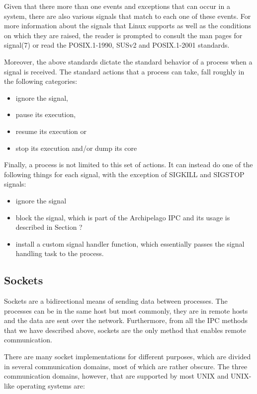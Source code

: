 Given that there more than one events and exceptions that can occur in a 
system, there are also various signals that match to each one of these
events. For more information about the signals that Linux supports as well as 
the conditions on which they are raised, the reader is prompted to consult the 
man pages for signal(7) or read the POSIX.1-1990, SUSv2 and POSIX.1-2001 
standards.
  
Moreover, the above standards dictate the standard behavior of a process when a 
signal is received. The standard actions that a process can take, fall roughly 
in the following categories:

\begin{itemize}
	\item ignore the signal,
	\item pause its execution,
	\item resume its execution or
	\item stop its execution and/or dump its core
\end{itemize}

Finally, a process is not limited to this set of actions. It can instead do one 
of the following things for each signal, with the exception of SIGKILL and 
SIGSTOP signals:

\begin{itemize}
	\item ignore the signal
	\item block the signal, which is part of the Archipelago IPC and its 
		usage is described in Section ?
	\item install a custom signal handler function, which essentially 
		passes the signal handling task to the process.
\end{itemize}

\subsection{Sockets}

Sockets are a bidirectional means of sending data between processes.  The 
processes can be in the same host but most commonly, they are in remote hosts 
and the data are sent over the network. Furthermore, from all the IPC methods 
that we have described above, sockets are the only method that enables remote 
communication. 

There are many socket implementations for different purposes, which are divided 
in several communication domains, most of which are rather obscure. The three 
communication domains, however, that are supported by most UNIX and UNIX-like 
operating systems are:

